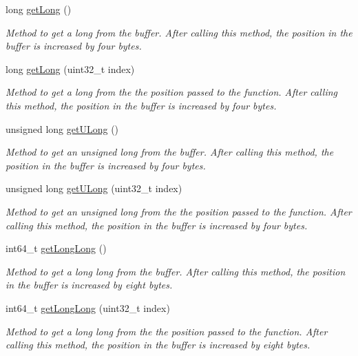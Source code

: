 \begin{DoxyCompactItemize}
long \hyperlink{classBuffer_a629d217da34e85943eb002910d2bb336}{getLong} ()
\begin{DoxyCompactList}\small\item\em Method to get a long from the buffer. After calling this method, the position in the buffer is increased by four bytes. \item\end{DoxyCompactList}\item 
long \hyperlink{classBuffer_a16bcd3bdb5ca1b9a12ca1dc76cf5f28b}{getLong} (uint32\_\-t index)
\begin{DoxyCompactList}\small\item\em Method to get a long from the the position passed to the function. After calling this method, the position in the buffer is increased by four bytes. \item\end{DoxyCompactList}\item 
unsigned long \hyperlink{classBuffer_a7145a0142c6dc0c31e1cac08d4f49435}{getULong} ()
\begin{DoxyCompactList}\small\item\em Method to get an unsigned long from the buffer. After calling this method, the position in the buffer is increased by four bytes. \item\end{DoxyCompactList}\item 
unsigned long \hyperlink{classBuffer_a70db4c2d0ad70f73ed930a0581dbb1e4}{getULong} (uint32\_\-t index)
\begin{DoxyCompactList}\small\item\em Method to get an unsigned long from the the position passed to the function. After calling this method, the position in the buffer is increased by four bytes. \item\end{DoxyCompactList}\item 
int64\_\-t \hyperlink{classBuffer_a515cf0ba59f1970b039362ef22cdcf6c}{getLongLong} ()
\begin{DoxyCompactList}\small\item\em Method to get a long long from the buffer. After calling this method, the position in the buffer is increased by eight bytes. \item\end{DoxyCompactList}\item 
int64\_\-t \hyperlink{classBuffer_a5a6117d58e6abb0c7ea50d2c302a4d59}{getLongLong} (uint32\_\-t index)
\begin{DoxyCompactList}\small\item\em Method to get a long long from the the position passed to the function. After calling this method, the position in the buffer is increased by eight bytes. \item\end{DoxyCompactList}\item 

\end{DoxyCompactItemize}
